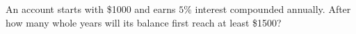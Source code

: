 An account starts with \$1000 and earns $5\%$ interest compounded annually. After how many whole years will its balance first reach at least \$1500?
